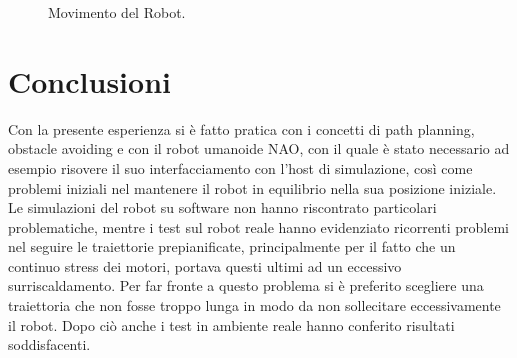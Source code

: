 \documentclass[english]{article}
\begin{document}
\begin{figure}[!ht]
\centering
{}
\caption{Movimento del Robot.}
\end{figure}

\newpage

\section{Conclusioni}
Con la presente esperienza si è fatto pratica con i concetti di path planning, obstacle avoiding e con il robot umanoide NAO, con il quale è stato necessario ad esempio risovere il suo interfacciamento con l'host di simulazione, così come problemi iniziali nel mantenere il robot in equilibrio nella sua posizione iniziale. Le simulazioni del robot su software non hanno riscontrato particolari problematiche, mentre i test sul robot reale hanno evidenziato ricorrenti problemi nel seguire le traiettorie prepianificate, principalmente per il fatto che un continuo stress dei motori, portava questi ultimi ad un eccessivo surriscaldamento. Per far fronte a questo problema si è preferito scegliere una traiettoria che non fosse troppo lunga in modo da non sollecitare eccessivamente il robot. Dopo ciò anche i test in ambiente reale hanno conferito risultati soddisfacenti.



\clearpage
\end{document}
